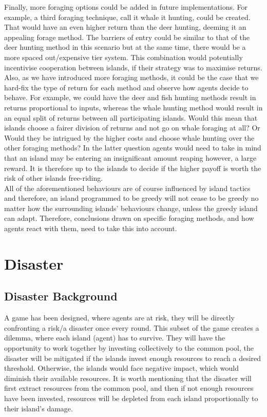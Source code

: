 Finally, more foraging options could be added in future implementations. For example, a third foraging technique, call it whale it hunting, could be created. That would have an even higher return than the deer hunting, deeming it an appealing forage method. The barriers of entry could be similar to that of the deer hunting method in this scenario but at the same time, there would be a more spaced out/expensive tier system. This combination would potentially incentivise cooperation between islands, if their strategy was to maximise returns. Also, as we have introduced more foraging methods, it could be the case that we hard-fix the type of return for each method and observe how agents decide to behave. For example, we could have the deer and fish hunting methods result in returns proportional to inputs, whereas the whale hunting method would result in an equal split of returns between all participating islands. Would this mean that islands choose a fairer division of returns and not go on whale foraging at all? Or Would they be intrigued by the higher costs and choose whale hunting over the other foraging methods? In the latter question agents would need to take in mind that an island may be entering an insignificant amount reaping however, a large reward. It is therefore up to the islands to decide if the higher payoff is worth the risk of other islands free-riding.\\

All of the aforementioned behaviours are of course influenced by island tactics and therefore, an island programmed to be greedy will not cease to be greedy no matter how the surrounding islands’ behaviours change, unless the greedy island can adapt. Therefore, conclusions drawn on specific foraging methods, and how agents react with them, need to take this into account.\\

\newpage
\section{Disaster}
\subsection{Disaster Background}

A game has been designed, where agents are at risk, they will be directly confronting a risk/a disaster once every round. This subset of the game creates a dilemma, where each island (agent) has to survive. They will have the opportunity to work together by investing collectively to the common pool, the disaster will be mitigated if the islands invest enough resources to reach a desired threshold. Otherwise, the islands would face negative impact, which would diminish their available resources. It is worth mentioning that the disaster will first extract resources from the common pool, and then if not enough resources have been invested, resources will be depleted from each island proportionally to their island’s damage.\\

